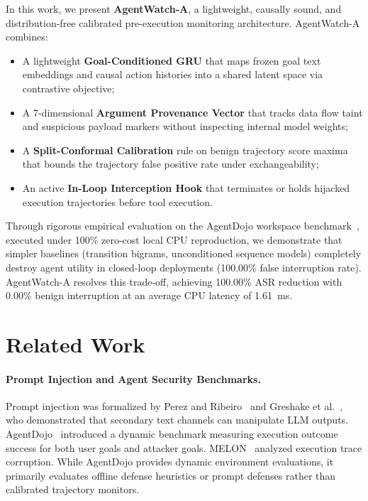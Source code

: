 \documentclass[11pt,a4paper]{article}
\begin{document}
In this work, we present \textbf{AgentWatch-A}, a lightweight, causally sound, and distribution-free calibrated pre-execution monitoring architecture. AgentWatch-A combines:
\begin{itemize}
    \item A lightweight \textbf{Goal-Conditioned GRU} that maps frozen goal text embeddings and causal action histories into a shared latent space via contrastive objective;
    \item A 7-dimensional \textbf{Argument Provenance Vector} that tracks data flow taint and suspicious payload markers without inspecting internal model weights;
    \item A \textbf{Split-Conformal Calibration} rule on benign trajectory score maxima that bounds the trajectory false positive rate under exchangeability;
    \item An active \textbf{In-Loop Interception Hook} that terminates or holds hijacked execution trajectories before tool execution.
\end{itemize}

Through rigorous empirical evaluation on the AgentDojo workspace benchmark~\cite{debenedetti2024agentdojo}, executed under 100\% zero-cost local CPU reproduction, we demonstrate that simpler baselines (transition bigrams, unconditioned sequence models) completely destroy agent utility in closed-loop deployments (100.00\% false interruption rate). AgentWatch-A resolves this trade-off, achieving 100.00\% ASR reduction with 0.00\% benign interruption at an average CPU latency of 1.61~ms.

\section{Related Work}
\label{sec:related_work}

\paragraph{Prompt Injection and Agent Security Benchmarks.}
Prompt injection was formalized by Perez and Ribeiro~\cite{perez2022ignore} and Greshake et al.~\cite{greshake2023not}, who demonstrated that secondary text channels can manipulate LLM outputs. AgentDojo~\cite{debenedetti2024agentdojo} introduced a dynamic benchmark measuring execution outcome success for both user goals and attacker goals. MELON~\cite{deng2024melon} analyzed execution trace corruption. While AgentDojo provides dynamic environment evaluations, it primarily evaluates offline defense heuristics or prompt defenses rather than calibrated trajectory monitors.
\end{document}
